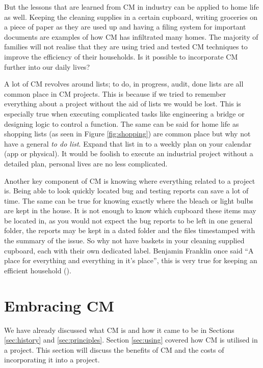 \documentclass[cmpstyle]{ueacmpstyle}
\begin{document}
		But the lessons that are learned from CM in industry can be applied to home life as well. Keeping the cleaning supplies in a certain cupboard, writing groceries on a piece of paper as they are used up and having a filing system for important documents are examples of how CM has infiltrated many homes. The majority of families will not realise that they are using tried and tested CM techniques to improve the efficiency of their households. Is it possible to incorporate CM further into our daily lives?
		
		A lot of CM revolves around lists; to do, in progress, audit, done lists are all common place in CM projects. This is because if we tried to remember everything about a project without the aid of lists we would be lost. This is especially true when executing complicated tasks like engineering a bridge or designing logic to control a function. The same can be said for home life as shopping lists (as seen in Figure \ref{fig:shopping}) are common place but why not have a general \emph{to do list}. Expand that list in to a weekly plan on your calendar (app or physical). It would be foolish to execute an industrial project without a detailed plan, personal lives are no less complicated. 
		
		Another key component of CM is knowing where everything related to a project is. Being able to look quickly located bug and testing reports can save a lot of time. The same can be true for knowing exactly where the bleach or light bulbs are kept in the house. It is not enough to know which cupboard these items may be located in, as you would not expect the bug reports to be left in one general folder, the reports may be kept in a dated folder and the files timestamped with the summary of the issue. So why not have baskets in your cleaning supplied cupboard, each with their own dedicated label. Benjamin Franklin once said \enquote{A place for everything and everything in it's place}, this is very true for keeping an efficient household (\cite{cm-at-home}).  
		
	\section{Embracing CM} \label{sec:embracing}
	We have already discussed what CM is and how it came to be in Sections \ref{sec:history} and \ref{sec:principles}. Section \ref{sec:using} covered how CM is utilised in a project. This section will discuss the benefits of CM and the costs of incorporating it into a project. 
	
\end{document}
